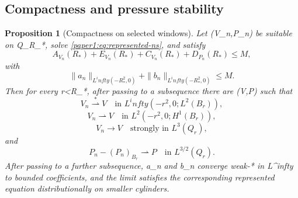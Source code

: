 \documentclass[11pt]{amsart}
\def\({}%
\def\){}%
\def\infty{infty}%
\theoremstyle{plain}
\newtheorem{proposition}[theorem]{Proposition}
\theoremstyle{definition}
\theoremstyle{remark}
\begin{document}
\subsection{Compactness and pressure stability}

\begin{proposition}[Compactness on selected windows]\label{paper1:prop:compactness}
Let \((V_n,P_n)\) be suitable on \(Q_{R_*}\), solve \eqref{paper1:eq:represented-ns}, and satisfy
\[
  A_{V_n}(R_*)+E_{V_n}(R_*)+C_{V_n}(R_*)+D_{P_n}(R_*)\le M,
\]
with
\[
  \|a_n\|_{L^\infty(-R_*^2,0)}+\|b_n\|_{L^\infty(-R_*^2,0)}\le M.
\]
Then for every \(r<R_*\), after passing to a subsequence there are \((V,P)\)
such that
\[
  V_n\stackrel{*}{\rightharpoonup}V
  \quad\text{in }L^\infty(-r^2,0;L^2(B_r)),
\]
\[
  V_n\rightharpoonup V
  \quad\text{in }L^2(-r^2,0;H^1(B_r)),
\]
\[
  V_n\to V
  \quad\text{strongly in }L^3(Q_r),
\]
and
\[
  P_n-(P_n)_{B_r}\rightharpoonup P
  \quad\text{in }L^{3/2}(Q_r).
\]
After passing to a further subsequence, \(a_n\) and \(b_n\) converge weak-* in
\(L^\infty\) to bounded coefficients, and the limit satisfies the corresponding
represented equation distributionally on smaller cylinders.
\end{proposition}
\end{document}
